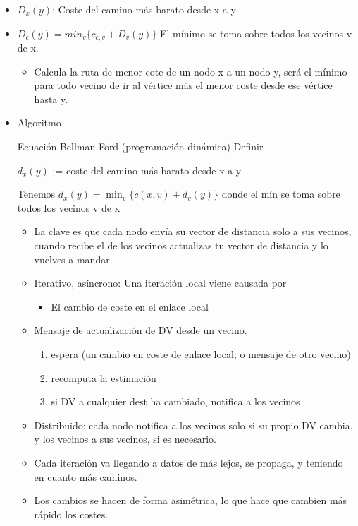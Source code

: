 \documentclass[12pt, twoside, openright]{report} %
\begin{document}
\begin{itemize}
	\item \(D_x(y)\): Coste del camino más barato desde x a y
	\item \(D_c(y)=min_v \{ c_{c,v}+D_v(y)\}\) El mínimo se toma sobre todos
	      los vecinos v de x.

	      \begin{itemize}
		      \item Calcula la ruta de menor cote de un nodo x a un nodo y, será el
		            mínimo para todo vecino de ir al vértice más el menor coste
		            desde ese vértice hasta y.
	      \end{itemize}
	\item Algoritmo

	      Ecuación Bellman-Ford (programación dinámica)
	      Definir

	      $d_x(y)$ := coste del camino más barato desde x a y

	      Tenemos $d_x(y) = \min_v \{c(x,v) + d_v(y)\}$ donde el mín se toma sobre todos los vecinos v de x
	      \begin{itemize}
		      \item La clave es que cada nodo envía su vector de distancia solo a sus
		            vecinos, cuando recibe el de los vecinos actualizas tu vector de
		            distancia y lo vuelves a mandar.
		      \item Iterativo, asíncrono: Una iteración local viene causada por

		            \begin{itemize}
			            \item El cambio de coste en el enlace local
		            \end{itemize}
		      \item Mensaje de actualización de DV desde un vecino.
		            \begin{enumerate}
			            \item espera (un cambio en coste
			                  de enlace local; o mensaje
			                  de otro vecino)

			            \item recomputa la estimación

			            \item si DV a cualquier dest ha
			                  cambiado, notifica a los
			                  vecinos
		            \end{enumerate}

		      \item Distribuido: cada nodo notifica a los vecinos solo si su propio DV
		            cambia, y los vecinos a sus vecinos, si es necesario.
		      \item Cada iteración va llegando a datos de más lejos, se propaga, y
		            teniendo en cuanto más caminos.
		      \item Los cambios se hacen de forma asimétrica, lo que hace que cambien
		            más rápido los costes.


\end{itemize}
\end{itemize}
\end{document}
